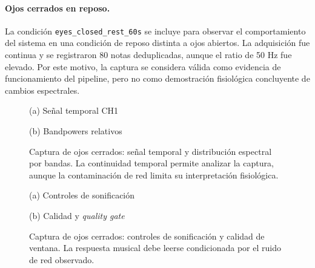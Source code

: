\paragraph{Ojos cerrados en reposo.}
La condición \texttt{eyes\_closed\_rest\_60s} se incluye para observar el comportamiento del sistema en una condición de reposo distinta a ojos abiertos. La adquisición fue continua y se registraron 80 notas deduplicadas, aunque el ratio de 50 Hz fue elevado. Por este motivo, la captura se considera válida como evidencia de funcionamiento del pipeline, pero no como demostración fisiológica concluyente de cambios espectrales.

\begin{figure}[htbp]
    \centering
    \begin{minipage}{0.49\textwidth}
        \centering
        \small (a) Señal temporal CH1
    \end{minipage}
    \hfill
    \begin{minipage}{0.49\textwidth}
        \centering
        \small (b) Bandpowers relativos
    \end{minipage}
    \caption{Captura de ojos cerrados: señal temporal y distribución espectral por bandas. La continuidad temporal permite analizar la captura, aunque la contaminación de red limita su interpretación fisiológica.}
    \label{fig:validacion_s01_02_eeg_bands}
\end{figure}

\begin{figure}[htbp]
    \centering
    \begin{minipage}{0.49\textwidth}
        \centering
        \small (a) Controles de sonificación
    \end{minipage}
    \hfill
    \begin{minipage}{0.49\textwidth}
        \centering
        \small (b) Calidad y \textit{quality gate}
    \end{minipage}
    \caption{Captura de ojos cerrados: controles de sonificación y calidad de ventana. La respuesta musical debe leerse condicionada por el ruido de red observado.}
    \label{fig:validacion_s01_02_controls_quality}
\end{figure}

